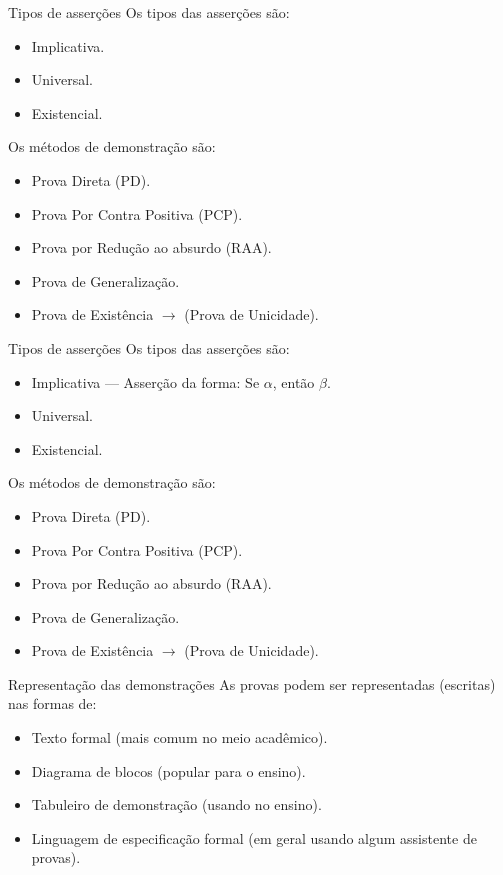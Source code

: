 \documentclass[aspectratio=169]{beamer}
\begin{document}
	\begin{frame}{Tipos de asserções}
		Os tipos das asserções são:
		\begin{itemize}
			\item {\color{red}Implicativa}.
			\item Universal.
			\item Existencial.
		\end{itemize}
		Os métodos de demonstração são:
		\begin{itemize}
			\item {\color{red}Prova Direta (PD)}.
			\item {\color{red}Prova Por Contra Positiva (PCP)}.
			\item Prova por Redução ao absurdo (RAA).
			\item Prova de Generalização.
			\item Prova de Existência $\rightarrow$ (Prova de Unicidade).
		\end{itemize}
	\end{frame}

	\begin{frame}{Tipos de asserções}
		Os tipos das asserções são:
		\begin{itemize}
			\item {\color{red}Implicativa} --- Asserção da forma: Se $\alpha$, então $\beta$.
			\item Universal.
			\item Existencial.
		\end{itemize}
		Os métodos de demonstração são:
		\begin{itemize}
			\item {\color{red}Prova Direta (PD)}.
			\item {\color{red}Prova Por Contra Positiva (PCP)}.
			\item Prova por Redução ao absurdo (RAA).
			\item Prova de Generalização.
			\item Prova de Existência $\rightarrow$ (Prova de Unicidade).
		\end{itemize}
	\end{frame}

	\begin{frame}{Representação das demonstrações}
		As provas podem ser representadas (escritas) nas formas de:
		\begin{itemize}
			\item Texto formal (mais comum no meio acadêmico).
			\item Diagrama de blocos (popular para o ensino).
			\item Tabuleiro de demonstração (usando no ensino).
			\item Linguagem de especificação formal (em geral usando algum assistente de provas).
		\end{itemize}
	\end{frame}
\end{document}
